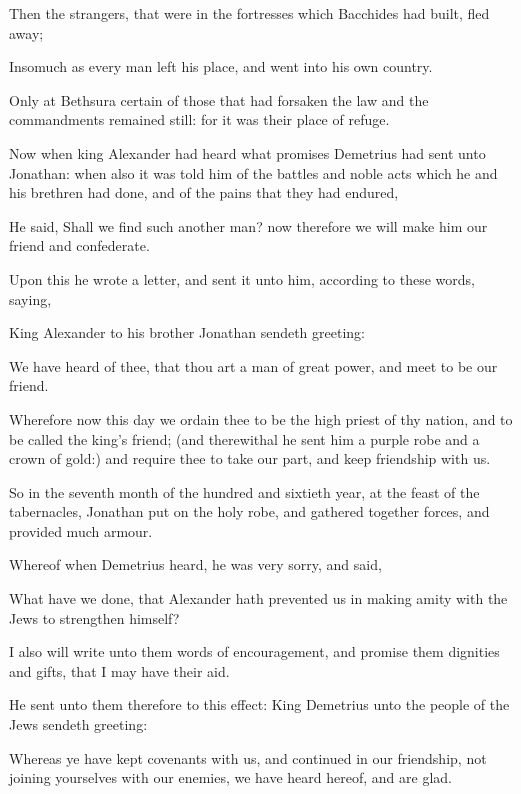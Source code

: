 {\par }{\PP {}Then the strangers, that were in the fortresses which Bacchides had built, fled away;
\par }{\PP {}Insomuch as every man left his place, and went into his own country.
\par }{\PP {}Only at Bethsura certain of those that had forsaken the law and the commandments remained still: for it was their place of refuge.
\par }{\PP {}Now when king Alexander had heard what promises Demetrius had sent unto Jonathan: when also it was told him of the battles and noble acts which he and his brethren had done, and of the pains that they had endured,
\par }{\PP {}He said, Shall we find such another man? now therefore we will make him our friend and confederate.
\par }{\PP {}Upon this he wrote a letter, and sent it unto him, according to these words, saying,
\par }{\PP {}King Alexander to his brother Jonathan sendeth greeting:
\par }{\PP {}We have heard of thee, that thou art a man of great power, and meet to be our friend.
\par }{\PP {}Wherefore now this day we ordain thee to be the high priest of thy nation, and to be called the king’s friend; (and therewithal he sent him a purple robe and a crown of gold:) and require thee to take our part, and keep friendship with us.
\par }{\PP {}So in the seventh month of the hundred and sixtieth year, at the feast of the tabernacles, Jonathan put on the holy robe, and gathered together forces, and provided much armour.
\par }{\PP {}Whereof when Demetrius heard, he was very sorry, and said,
\par }{\PP {}What have we done, that Alexander hath prevented us in making amity with the Jews to strengthen himself?
\par }{\PP {}I also will write unto them words of encouragement, and promise them dignities and gifts, that I may have their aid.
\par }{\PP {}He sent unto them therefore to this effect: King Demetrius unto the people of the Jews sendeth greeting:
\par }{\PP {}Whereas ye have kept covenants with us, and continued in our friendship, not joining yourselves with our enemies, we have heard hereof, and are glad.
}
